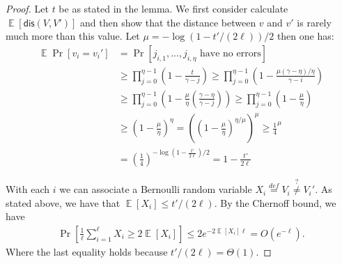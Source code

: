 \documentclass[11pt]{article}
\DeclareMathOperator*{\expe}{\mathbb{E}}
\newcommand{\dis}{\ensuremath{\mathsf{dis}}}
\begin{document}
\begin{proof}
Let $t$ be as stated in the lemma.
We first consider calculate $\expe[\dis(V, V')]$ and then show that the distance between $v$ and $v'$ is rarely much more than this value.
Let $\mu = -\log(1-t'/(2\ell))/2$ then one has:
\begin{align*}
\expe \Pr[v_i = v_i'] &=\Pr[j_{i,1},..., j_{i,\eta}\text{ have no errors}]\\
&\geq \prod_{j=0}^{\eta-1}\left(1 - \frac{t}{\gamma-j}\right)\geq \prod_{j=0}^{\eta-1}\left( 1-\frac{\mu(\gamma-\eta)/\eta}{\gamma-i}\right)\\
&\geq  \prod_{j=0}^{\eta-1}\left( 1-\frac{\mu}{\eta}\left(\frac{\gamma-\eta}{\gamma-j}\right)\right)\geq \prod_{j=0}^{\eta-1}\left( 1-\frac{\mu}{\eta}\right) \\
&\geq \left(1-\frac{\mu}{\eta}\right)^{\eta} =\left( \left(1-\frac{\mu}{\eta}\right)^{\eta/\mu}\right)^\mu\geq \frac{1}{4}^\mu\\
& = \left(\frac{1}{4}\right)^{-\log(1-\frac{t'}{2\ell})/2} = 1-\frac{t'}{2\ell}
\end{align*}

With each $i$ we can associate a Bernoulli random variable $X_i \overset{def}= V_i \overset{?}\neq V_i'$.  As stated above, we have that $\expe[X_i] \leq  t'/(2\ell)$. By the Chernoff bound, we have
\begin{align*}
\Pr\left[\frac{1}{\ell} \sum_{i=1}^\ell X_i\geq 2\expe[X_i]\right]\leq 2e^{-2\expe[X_i]\ell} = O(e^{- \ell}).
\end{align*}
Where the last equality holds because $t'/(2\ell) = \Theta(1)$.
\end{proof}
\end{document}
